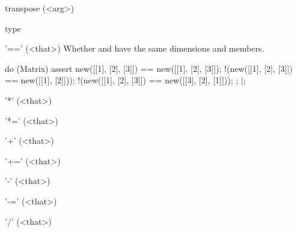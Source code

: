 \begin{urbiscriptapi}
\item[transpose](<arg>)%
\begin{urbiassert}

\end{urbiassert}

\item[type]%
\begin{urbiassert}

\end{urbiassert}

\item['=='](<that>)%
  Whether \this and \that have the same dimensions and members.
\begin{urbiscript}
do (Matrix)
{
  assert
  {
      new([[1], [2], [3]]) == new([[1], [2], [3]]);
    !(new([[1], [2], [3]]) == new([[1], [2]]));
    !(new([[1], [2], [3]]) == new([[3], [2], [1]]));
  };
}|;
\end{urbiscript}

\item['*'](<that>)%
\begin{urbiassert}

\end{urbiassert}

\item['*='](<that>)%
\begin{urbiassert}

\end{urbiassert}

\item['+'](<that>)%
\begin{urbiassert}

\end{urbiassert}

\item['+='](<that>)%
\begin{urbiassert}

\end{urbiassert}

\item['-'](<that>)%
\begin{urbiassert}

\end{urbiassert}

\item['-='](<that>)%
\begin{urbiassert}

\end{urbiassert}

\item['/'](<that>)%
\begin{urbiassert}


\end{urbiassert}
\end{urbiscriptapi}
